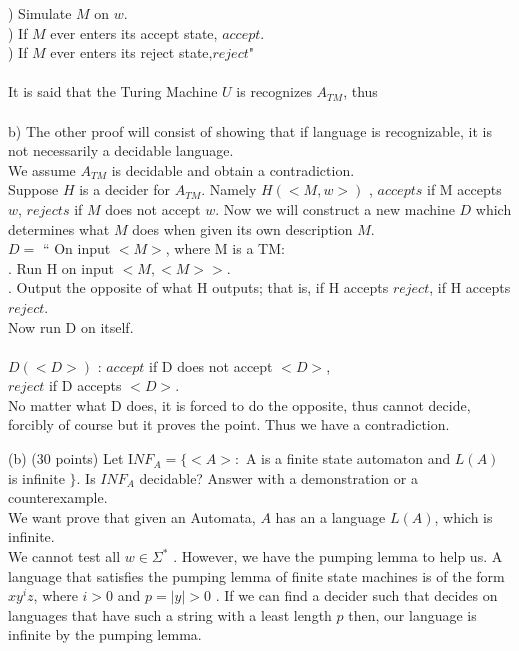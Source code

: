 \documentclass{report}
\newcommand{\me}[1]{
\begin{math}
#1
\end{math}
}
\begin{document}
   ) Simulate $M$ on $w$.\\
   ) If $M$ ever enters its accept state, $accept$. \\
   ) If $M$ ever enters its reject state,$reject$" \\ \\
    It is said that the Turing Machine $U$ is recognizes $A_{TM}$, thus  \\ \\
b) The other proof will consist of showing that if language is recognizable, it is not necessarily a decidable language. \\ 
\indent We assume $A_{TM}$ is decidable and obtain a contradiction. \\ 
Suppose $H$ is a decider for $A_{TM}$. Namely \me{H(<M,w>)}, $accepts$ if M accepts $w$, $rejects$ if $M$ does not accept $w$. Now we will construct a new machine $D$ which determines what $M$ does when given its own description $M$. \\
\indent \me{D =} `` On input $<M>$, where M is a TM: \\
\indent {}. Run H on input $<M,<M>>$. \\
\indent {}. Output the opposite of what H outputs; that is, if H accepts $reject$, \indent \indent  if H accepts $reject$.\\ Now run D on itself. \\ \\

\me{D(<D>)}: $accept$ if D does not accept $<D>$, \\ \indent \indent \indent \indent \indent$reject$ if D accepts $<D>$. \\
No matter what D does, it is forced to do the opposite, thus cannot decide, forcibly of course but it proves the point. Thus we have a contradiction. 

\newpage

(b) (30 points)  Let I$NF_A =  \{<A>: $ A is a finite state automaton and \me{L(A)} is infinite $\} $. Is $INF_A$ decidable? Answer with a demonstration or a counterexample. \\


We want prove that given  an Automata, $A$ has an a language $L(A)$, which is infinite. \\ We cannot test all \me{w \in \Sigma^*}. However, we have the pumping lemma to help us. A language that satisfies the pumping lemma of finite state machines is of the form $xy^iz$, where \me{i >0} and \me{p=|y|>0}. If we can find a decider such that decides on languages that have such a string with a least length $p$ then, our language is infinite by the pumping lemma. \\ \\
 
\end{document}
